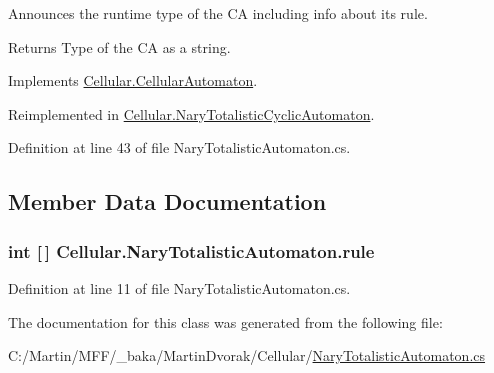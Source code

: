 Announces the runtime type of the C\+A including info about its rule. 

\begin{DoxyReturn}{Returns}
Type of the C\+A as a string.
\end{DoxyReturn}


Implements \hyperlink{class_cellular_1_1_cellular_automaton_abe4b92fd405530c8a08cc07a3a19fff4}{Cellular.\+Cellular\+Automaton}.



Reimplemented in \hyperlink{class_cellular_1_1_nary_totalistic_cyclic_automaton_ac5c39cfb72386e3ab6132ab420091ae9}{Cellular.\+Nary\+Totalistic\+Cyclic\+Automaton}.



Definition at line 43 of file Nary\+Totalistic\+Automaton.\+cs.



\subsection{Member Data Documentation}
\hypertarget{class_cellular_1_1_nary_totalistic_automaton_a878c767c6823bd8ed8dc0f7d2ccb1fd2}{}
\subsubsection[{rule}]{\setlength{\rightskip}{0pt plus 5cm}int \mbox{[}$\,$\mbox{]} Cellular.\+Nary\+Totalistic\+Automaton.\+rule\hspace{0.3cm}{\ttfamily [protected]}}\label{class_cellular_1_1_nary_totalistic_automaton_a878c767c6823bd8ed8dc0f7d2ccb1fd2}


Definition at line 11 of file Nary\+Totalistic\+Automaton.\+cs.



The documentation for this class was generated from the following file\+:\begin{DoxyCompactItemize}
\item 
C\+:/\+Martin/\+M\+F\+F/\+\_\+baka/\+Martin\+Dvorak/\+Cellular/\hyperlink{_nary_totalistic_automaton_8cs}{Nary\+Totalistic\+Automaton.\+cs}\end{DoxyCompactItemize}
